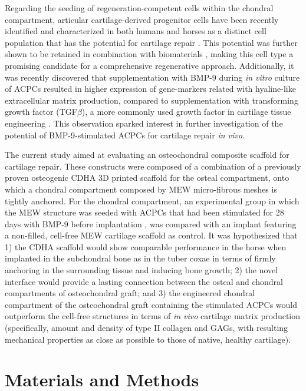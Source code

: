 \documentclass[twocolumn, serif, empirical, authordate, seplic]{jote-article}
\begin{document}
Regarding the seeding of regeneration-competent cells within the chondral compartment, articular cartilage-derived progenitor cells have been recently identified and characterized in both humans and horses as a distinct cell population that has the potential for cartilage repair \parencite{McCarthy2012, Williams2010}. This potential was further shown to be retained in combination with biomaterials \parencite{Frisbie2015, Levato2017}, making this cell type a promising candidate for a comprehensive regenerative approach. Additionally, it was recently discovered that supplementation with BMP-9 during \emph{in vitro} culture of ACPCs resulted in higher expression of gene-markers related with hyaline-like extracellular matrix production, compared to supplementation with transforming growth factor (TGF$\beta$), a more commonly used growth factor in cartilage tissue engineering \parencite{Morgan2020}. This observation sparked interest in further investigation of the potential of BMP-9-stimulated ACPCs for cartilage repair \emph{in vivo}.

The current study aimed at evaluating an osteochondral composite scaffold for cartilage repair. These constructs were composed of a combination of a previously proven osteogenic CDHA 3D printed scaffold for the osteal compartment, onto which a chondral compartment composed by MEW micro-fibrous meshes is tightly anchored. For the chondral compartment, an experimental group in which the MEW structure was seeded with ACPCs that had been stimulated for 28 days with BMP-9 before implantation \parencite{Abinzano2018}, was compared with an implant featuring a non-filled, cell-free MEW cartilage scaffold as control. It was hypothesized that 1) the CDHA scaffold would show comparable performance in the horse when implanted in the subchondral bone as in the tuber coxae in terms of firmly anchoring in the surrounding tissue and inducing bone growth; 2) the novel interface would provide a lasting connection between the osteal and chondral compartments of osteochondral graft; and 3) the engineered chondral compartment of the osteochondral graft containing the stimulated ACPCs would outperform the cell-free structures in terms of \emph{in vivo} cartilage matrix production (specifically, amount and density of type II collagen and GAGs, with resulting mechanical properties as close as possible to those of native, healthy cartilage).

 {}\section*{Materials and Methods} 
\end{document}
